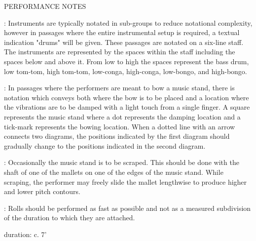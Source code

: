 \documentclass[11pt]{article}
\begin{document}
\begin{center}
\huge PERFORMANCE NOTES
\end{center}
\begingroup
\begin{center}

 : Instruments are typically notated in sub-groups to reduce notational complexity, however in passages where the entire instrumental setup is required, a textual indication "drums" will be given. These passages are notated on a six-line staff. The instruments are represented by the spaces within the staff including the spaces below and above it. From low to high the spaces represent the bass drum, low tom-tom, high tom-tom, low-conga, high-conga, low-bongo, and high-bongo.
\rightskip\leftskip
\phantom{text} \hfill \phantom{()}

 : In passages where the performers are meant to bow a music stand, there is notation which conveys both where the bow is to be placed and a location where the vibrations are to be damped with a light touch from a single finger. A square represents the music stand where a dot represents the damping location and a tick-mark represents the bowing location. When a dotted line with an arrow connects two diagrams, the positions indicated by the first diagram should gradually change to the positions indicated in the second diagram.
\rightskip\leftskip
\phantom{text} \hfill \phantom{()}

 : Occasionally the music stand is to be scraped. This should be done with the shaft of one of the mallets on one of the edges of the music stand. While scraping, the performer may freely slide the mallet lengthwise to produce higher and lower pitch contours.
\rightskip\leftskip
\phantom{text} \hfill \phantom{()}

 : Rolls should be performed as fast as possible and not as a measured subdivision of the duration to which they are attached.
\rightskip\leftskip
\phantom{text} \hfill \phantom{()}

\end{center}
\endgroup

\vspace*{9\baselineskip}


\vspace*{26\baselineskip}

\begin{center}
duration: c. 7'
\end{center}
\end{document}
